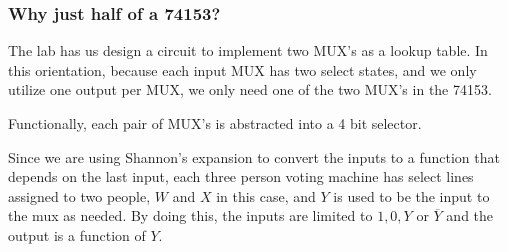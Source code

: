 \documentclass[12pt]{article}
\begin{document}
\subsubsection*{Why just half of a 74153?}
The lab has us design a circuit to implement two MUX's as a lookup table. In
this orientation, because each input MUX has two select states, and we only
utilize one output per MUX, we only need one of the two MUX's in the 74153.

Functionally, each pair of MUX's is abstracted into a 4 bit
selector.

Since we are using Shannon's expansion to convert the inputs to a function that
depends on the last input, each three person voting machine has select lines
assigned to two people, \(W\) and \(X\) in this case, and \(Y\) is used to be the
input to the mux as needed. By doing this, the inputs are limited to \(1, 0, Y
\) or  \(\overline{Y}\) and the output is a function of \(Y\).
\end{document}
